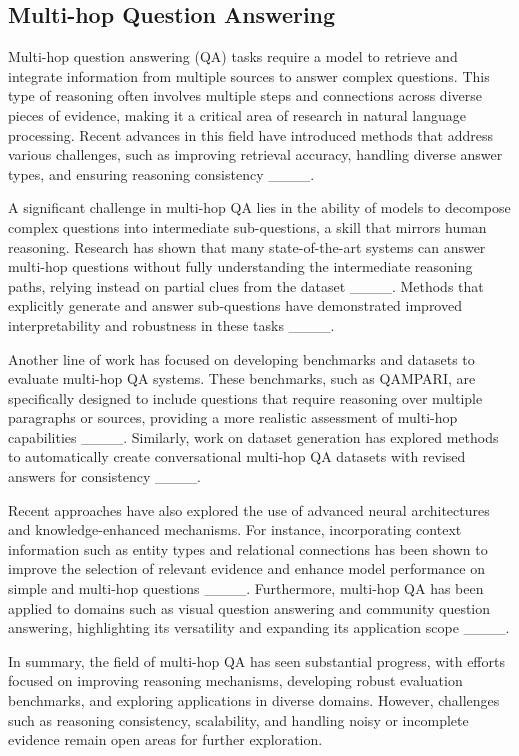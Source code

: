 \subsection{Multi-hop Question Answering}

Multi-hop question answering (QA) tasks require a model to retrieve and integrate information from multiple sources to answer complex questions. This type of reasoning often involves multiple steps and connections across diverse pieces of evidence, making it a critical area of research in natural language processing. Recent advances in this field have introduced methods that address various challenges, such as improving retrieval accuracy, handling diverse answer types, and ensuring reasoning consistency ____.

A significant challenge in multi-hop QA lies in the ability of models to decompose complex questions into intermediate sub-questions, a skill that mirrors human reasoning. Research has shown that many state-of-the-art systems can answer multi-hop questions without fully understanding the intermediate reasoning paths, relying instead on partial clues from the dataset ____. Methods that explicitly generate and answer sub-questions have demonstrated improved interpretability and robustness in these tasks ____.

Another line of work has focused on developing benchmarks and datasets to evaluate multi-hop QA systems. These benchmarks, such as QAMPARI, are specifically designed to include questions that require reasoning over multiple paragraphs or sources, providing a more realistic assessment of multi-hop capabilities ____. Similarly, work on dataset generation has explored methods to automatically create conversational multi-hop QA datasets with revised answers for consistency ____.

Recent approaches have also explored the use of advanced neural architectures and knowledge-enhanced mechanisms. For instance, incorporating context information such as entity types and relational connections has been shown to improve the selection of relevant evidence and enhance model performance on simple and multi-hop questions ____. Furthermore, multi-hop QA has been applied to domains such as visual question answering and community question answering, highlighting its versatility and expanding its application scope ____.

In summary, the field of multi-hop QA has seen substantial progress, with efforts focused on improving reasoning mechanisms, developing robust evaluation benchmarks, and exploring applications in diverse domains. However, challenges such as reasoning consistency, scalability, and handling noisy or incomplete evidence remain open areas for further exploration.